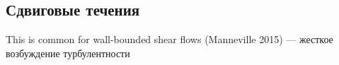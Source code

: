 \begin{comment}
In open flows where no boundaries limit the flow in the wall-normal direction, horseshoe or hairpin shaped vortices are commonly observed (Head and Bandyopadhyay, 1981; Robinson, 1991; Adrian et al., 2000; Adrian, 2007). Close to the wall, these structures are similar to a counter-rotating vortex pair, but they are inclined and extend further into the free stream, where they are connected, forming a hairpin shaped structure. The concept goes back more than half a century to Theodorsen (1952), an illustration is reproduced in figure 1.2.1(b). To better understand the dynamical properties of these typical flow structures, simulations are often performed in so-called minimal flow units defined by the fact that turbulence cannot be sustained if any of the dimensions is reduced (Jiménez and Moin, 1991), with some freedom in the definition of sustained turbulence and the ratio of the dimensions. The concept is useful because it allows to extract features of turbulence which are otherwise obfuscated by spatial processes and because a small periodic domain is cheaper in numerical simulations. In such a minimal flow unit, a self-sustaining cycle of near-wall turbulence has been identified (Hamilton et al., 1995; Waleffe, 1997, 2003), connecting the typical flow structures and their instabilities. The cycle starts with a pair of counter-rotating streamwise-aligned vortices, which create a pair of streaks through the lift-up effect. The streaks, initially straight, are linearly unstable to developing a wavy modulation, and the period in which the streaks are created is about as long as the subsequent period during which the instabilities grow. As the modulation becomes too strong, the structures break up, leaving behind a flow with strong downstream variations. The cycle is closed by nonlinear interactions recreating the downstream vortices. This so called self-sustaining process is found in many shear flows and was, for example, observed experimentally by Duriez et al. (2009). It also served as the stimulus for making an analogy between fluid mechanics and magnetohydrodynamic dynamos (Riols et al., 2013). 
\end{comment}

	\subsection{Сдвиговые течения}

This is common for wall-bounded shear flows (Manneville 2015) --- жесткое возбуждение турбулентности



